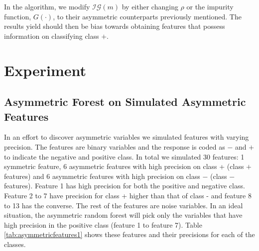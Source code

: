 \documentclass[twoside,11pt]{article}
\begin{document}
In the algorithm, we modify $\mathcal{IG}(m)$ by either changing $\rho$ or the impurity function, $G(\cdot)$, to their asymmetric counterparts previously mentioned. The results yield should then be bias towards obtaining features that possess information on classifying class $+$.

\section{Experiment}
\subsection{Asymmetric Forest on Simulated Asymmetric Features}
In an effort to discover asymmetric variables we simulated features with varying precision. The features are binary variables and the response is coded as $-$ and $+$ to indicate the negative and positive class. In total we simulated 30 features: 1 symmetric feature, 6 asymmetric features with high precision on class + (class $+$ features) and 6 asymmetric features with high precision on class $-$ (class $-$ features).  Feature 1 has high precision for both the positive and negative class. Feature 2 to 7 have precision for class + higher than that of class - and feature 8 to 13 has the converse. The rest of the features are noise variables. In an ideal situation, the asymmetric random forest will pick only the variables that have high precision in the positive class (feature 1 to feature 7). Table \ref{tab:asymmetricfeatures1} shows these features and their precisions for each of the classes.
\end{document}
